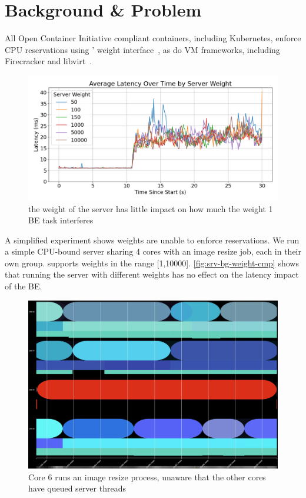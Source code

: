
\section{Background \& Problem}

All Open Container Initiative compliant containers, including Kubernetes,
enforce CPU reservations using \cgroups{}' weight interface~\cite{oci-cgroups,
docker-docs-cgroups, container-isolation-article}, as do VM frameworks,
including Firecracker and
libvirt~\cite{firecracker-cgroups,afaas,libvirt-cgroups}. 

\begin{figure}[t]
    \centering
    \includegraphics[width=\columnwidth]{graphs/srv-bg-weight-cmp-low.png}
    \caption{ the weight of the server has little impact on how much the
    weight 1 BE task interferes }\label{fig:srv-bg-weight-cmp}
\end{figure}


A simplified experiment shows \cgroups{} weights are unable to enforce
reservations. We run a simple CPU-bound server sharing 4 cores with an image
resize job, each in their own group. \cgroups{} supports weights in the range
[1,10000]. \autoref{fig:srv-bg-weight-cmp} shows that running the server with
different weights has no effect on the latency impact of the BE.

\begin{figure}[t]
    \centering
    \includegraphics[width=\columnwidth]{graphs/schedviz-problem.png}
    \caption{Core 6 runs an image resize process, unaware that the other cores
    have queued server threads}\label{fig:schedviz-problem}
\end{figure}

